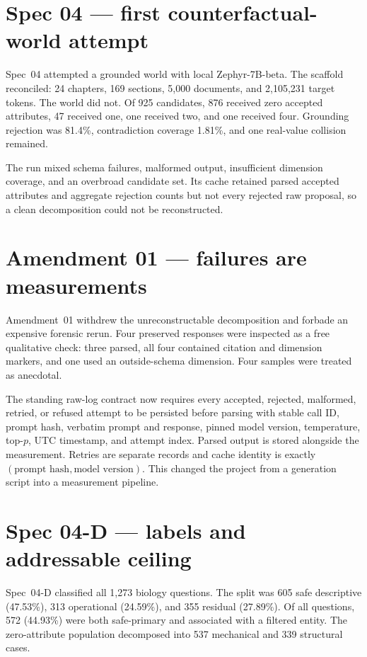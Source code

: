\documentclass[11pt]{article}
\begin{document}
\section{Spec 04 --- first counterfactual-world attempt}

Spec~04 attempted a grounded world with local Zephyr-7B-beta. The scaffold
reconciled: 24 chapters, 169 sections, 5,000 documents, and 2,105,231 target
tokens. The world did not. Of 925 candidates, 876 received zero accepted
attributes, 47 received one, one received two, and one received four. Grounding
rejection was 81.4\%, contradiction coverage 1.81\%, and one real-value
collision remained.

The run mixed schema failures, malformed output, insufficient dimension
coverage, and an overbroad candidate set. Its cache retained parsed accepted
attributes and aggregate rejection counts but not every rejected raw proposal,
so a clean decomposition could not be reconstructed.

\section{Amendment 01 --- failures are measurements}

Amendment~01 withdrew the unreconstructable decomposition and forbade an
expensive forensic rerun. Four preserved responses were inspected as a free
qualitative check: three parsed, all four contained citation and dimension
markers, and one used an outside-schema dimension. Four samples were treated as
anecdotal.

The standing raw-log contract now requires every accepted, rejected, malformed,
retried, or refused attempt to be persisted before parsing with stable call ID,
prompt hash, verbatim prompt and response, pinned model version, temperature,
top-$p$, UTC timestamp, and attempt index. Parsed output is stored alongside the
measurement. Retries are separate records and cache identity is exactly
\((\text{prompt hash},\text{model version})\). This changed the project from a
generation script into a measurement pipeline.

\section{Spec 04-D --- labels and addressable ceiling}

Spec~04-D classified all 1,273 biology questions. The split was 605 safe
descriptive (47.53\%), 313 operational (24.59\%), and 355 residual (27.89\%).
Of all questions, 572 (44.93\%) were both safe-primary and associated with a
filtered entity. The zero-attribute population decomposed into 537 mechanical
and 339 structural cases.
\end{document}
